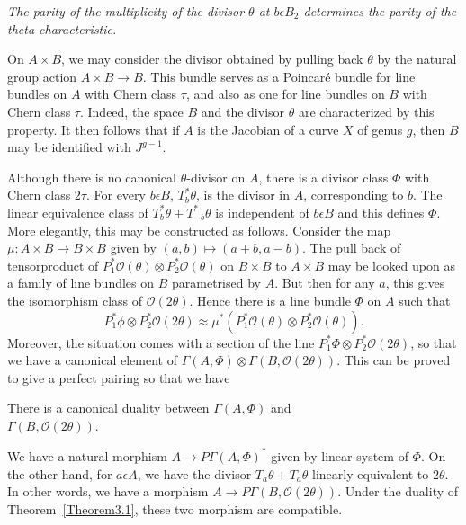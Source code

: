 \begin{TM}
\textit{The parity of the multiplicity of the divisor $\theta$ at
  $b\epsilon B_2$ determines the parity of the theta characteristic.}
\end{TM}

On $A\times B$, we may consider the divisor obtained by pulling back
$\theta$ by the natural group action $A\times B\to B$. This bundle
serves as a Poincar\'e bundle for line bundles on $A$ with Chern class
$\tau$, and also as one for line bundles on $B$ with Chern class
$\tau$. Indeed, the space $B$ and the divisor $\theta$ are
characterized by this property. It then follows that if $A$ is the
Jacobian of a curve $X$ of genus $g$, then $B$ may be identified with
$J^{g-1}$. 

Although there is no canonical $\theta$-divisor on $A$, there is a
divisor class $\Phi$ with Chern class $2\tau$. For every $b\epsilon
B$, $T^{\ast}_b\theta$, is the divisor in $A$, corresponding to
$b$. The linear equivalence class of
$T^{\ast}_b\theta+T^{\ast}_{-b}\theta$ is independent of $b\epsilon B$
and this defines $\Phi$. More elegantly, this may be constructed as
follows. Consider the map $\mu:A\times B\to B\times B$ given by
$(a,b)\mapsto (a+b,a-b)$. The pull back of tensor\pageoriginale product of
$P^{\ast}_1\mathscr{O}(\theta)\otimes P^{\ast}_2\mathscr{O}(\theta)$
on $B\times B$ to $A\times B$ may be looked upon as a family of line
bundles on $B$ parametrised by $A$. But then for any $a$, this gives
the isomorphism class of $\mathscr{O}(2\theta)$. Hence there is a line
bundle $\Phi$ on $A$ such that 
$$
P^{\ast}_1\phi \otimes P^{\ast}_2\mathscr{O}(2\theta)\approx
\mu^{\ast}\left(P^{\ast}_1\mathscr{O}(\theta)\otimes P^{\ast}_2\mathscr{O}(\theta)\right).
$$
Moreover, the situation comes with a section of the line
$P^{\ast}_1\Phi \otimes P^{\ast}_2\mathscr{O}(2\theta)$, so that we
have a canonical element of $\Gamma(A,\Phi)\otimes
\Gamma(B,\mathscr{O}(2\theta))$. This can be proved to give a perfect
pairing so that we have 

\begin{Theorem}\label{Theorem3.1}
There is a canonical duality between $\Gamma(A,\Phi)$ and\\
$\Gamma(B,\mathscr{O}(2\theta))$. 
\end{Theorem}

We have a natural morphism $A\to P\Gamma (A,\Phi)^{\ast}$ given by
linear system of $\Phi$. On the other hand, for $a\epsilon A$, we have
the divisor $T_a\theta+T_{a}\theta$ linearly equivalent to
$2\theta$. In other words, we have a morphism $A\to
P\Gamma(B,\mathscr{O}(2\theta))$. Under the duality of
Theorem~\ref{Theorem3.1}, these two morphism are compatible. 

